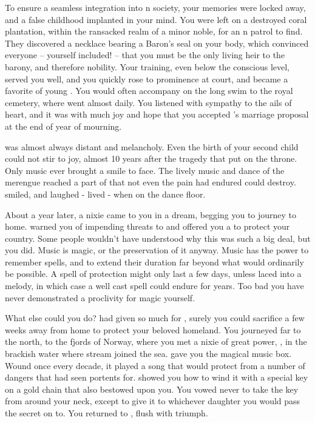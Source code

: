 \documentclass[char]{NeptuneBall}
\begin{document}
To ensure a seamless integration into \pAtlantis{}n society, your memories were locked away, and a false childhood implanted in your mind. You were left on a destroyed coral plantation, within the ransacked realm of a minor noble, for an \pAtlantis{}n patrol to find.  They discovered a necklace bearing a Baron's seal on your body, which convinced everyone -- yourself included! -- that you must be the only living heir to the barony, and therefore nobility.  Your training, even below the conscious level, served you well, and you quickly rose to prominence at court, and became a favorite of young \cKing{\King} \cKing{}. You would often accompany \cKing{\them} on the long swim to the royal cemetery, where \cKing{\they} went almost daily. You listened with sympathy to the ails of \cKing{\their} heart, and it was with much joy and hope that you accepted \cKing{\King} \cKing{}'s marriage proposal at the end of \cKing{\their} year of mourning.

\cKing{\King} \cKing{} was almost always distant and melancholy. Even the birth of your second child could not stir \cKing{\them} to joy, almost 10 years after the tragedy that put \cKing{\them} on the throne. Only music ever brought a smile to \cKing{\their} face. The lively music and dance of the merengue reached a part of \cKing{\them} that not even the pain \cKing{\they} had endured could destroy. \cKing{\They} smiled, and laughed - \cKing{\They} lived - when \cKing{\they} \cKing{\were} on the dance floor.

About a year later, a nixie came to you in a dream, begging you to journey to \cNixie{\their} home. \cNixie{\They} warned you of impending threats to \pAtlantis{} and offered you a \iMusicBox{\MYname} to protect your country. Some people wouldn't have understood why this was such a big deal, but you did. Music is magic, or the preservation of it anyway. Music has the power to remember spells, and to extend their duration far beyond what would ordinarily be possible. A spell of protection might only last a few days, unless laced into a melody, in which case a well cast spell could endure for years. Too bad you have never demonstrated a proclivity for magic yourself.

What else could you do? \cKing{} had given so much for \pAtlantis{}, surely you could sacrifice a few weeks away from home to protect your beloved homeland. You journeyed far to the north, to the fjords of Norway, where you met a nixie of great power, \cNixie{\MYname}, in the brackish water where \cNixie{\their} stream joined the sea. \cNixie{} gave you the magical music box. Wound once every decade, it played a song that would protect \pAtlantis{} from a number of dangers that \cNixie{} had seen portents for. \cNixie{\They} showed you how to wind it with a special key on a gold chain that \cNixie{\they} also bestowed upon you. You vowed never to take the key from around your neck, except to give it to whichever daughter you would pass the secret on to. You returned to \pAtlantis{}, flush with triumph.
\end{document}
